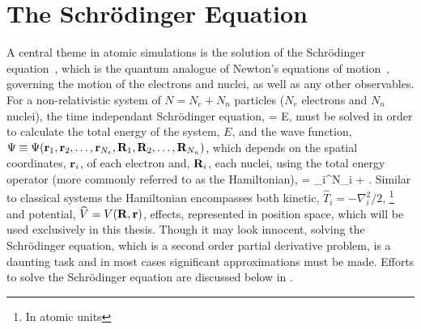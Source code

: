 \section{The Schr\"odinger Equation}
\label{sec:schrodinger}

A central theme in atomic simulations is the solution of the Schr\"odinger equation~\cite{schrodinger-equation-1926}, which is the quantum analogue of Newton's equations of motion~\cite{newton-latin}, governing the motion of the electrons and nuclei, as well as any other observables.
For a non-relativistic system of $N = N_e + N_n$ particles ($N_e$ electrons and $N_n$ nuclei), the time independant Schr\"odinger equation, %
 \Psi = E\Psi,
\eeq
must be solved in order to calculate the total energy of the system, $E$, and the wave function, $\Psi \equiv \Psi({\mathrm{\mathbf{\bm{r}}}}_1, {\mathrm{\mathbf{\bm{r}}}}_2, \ldots, {\mathrm{\mathbf{\bm{r}}}}_{N_e}, {\mathrm{\mathbf{\bm{R}}}}_1, {\mathrm{\mathbf{\bm{R}}}}_2, \ldots, {\mathrm{\mathbf{\bm{R}}}}_{N_n})$, which depends on the spatial coordinates, ${\mathrm{\mathbf{\bm{r}}}}_i$, of each electron and, ${\mathrm{\mathbf{\bm{R}}}}_i$, each nuclei, using the total energy operator (more commonly referred to as the Hamiltonian),
 = \sum_i^{N}_i  + .
\eeq
Similar to classical systems the Hamiltonian encompasses both kinetic, $\widehat{T}_i = -\nabla_i^2/2$, \footnote{In atomic units} and potential, $\widehat{V} = V({\mathrm{\mathbf{\bm{R}}}}, {\mathrm{\mathbf{\bm{r}}}})$, effects, represented in position space, which will be used exclusively in this thesis.
Though it may look innocent, solving the Schr\"odinger equation, which is a second order partial derivative problem, is a daunting task and in most cases significant approximations must be made.
Efforts to solve the Schr\"odinger equation are discussed below in .
